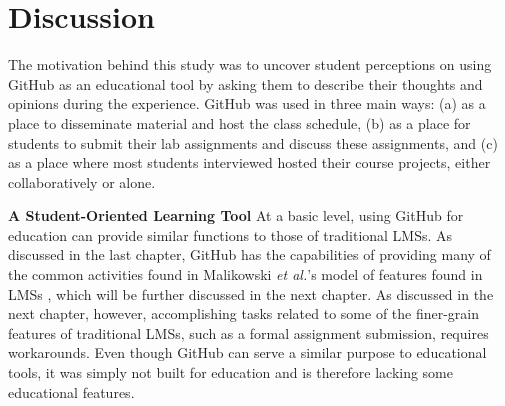 



\section{Discussion}
The motivation behind this study was to uncover student perceptions on using GitHub as an educational tool by asking them to describe their thoughts and opinions during the experience. GitHub was used in three main ways: (a) as a place to disseminate material and host the class schedule, (b) as a place for students to submit their lab assignments and discuss these assignments, and (c) as a place where most students interviewed hosted their course projects, either collaboratively or alone.

\textbf{A Student-Oriented Learning Tool}
At a basic level, using GitHub for education can provide similar functions to those of traditional LMSs. As discussed in the last chapter, GitHub has the capabilities of providing many of the common activities found in Malikowski \textit{et al.}'s model of features found in LMSs \cite{malikowski2007model}, which will be further discussed in the next chapter. As discussed in the next chapter, however, accomplishing tasks related to some of the finer-grain features of traditional LMSs, such as a formal assignment submission, requires workarounds. Even though GitHub can serve a similar purpose to educational tools, it was simply not built for education and is therefore lacking some educational features.

